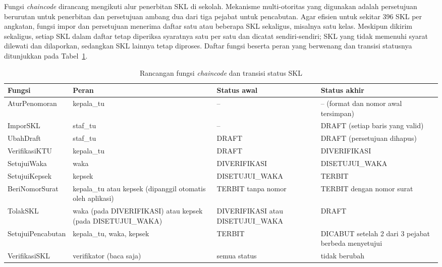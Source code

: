 Fungsi \textit{chaincode} dirancang mengikuti alur penerbitan SKL di sekolah. Mekanisme multi-otoritas yang digunakan adalah persetujuan berurutan untuk penerbitan dan persetujuan ambang dua dari tiga pejabat untuk pencabutan. Agar efisien untuk sekitar 396 SKL per angkatan, fungsi impor dan persetujuan menerima daftar satu atau beberapa SKL sekaligus, misalnya satu kelas. Meskipun dikirim sekaligus, setiap SKL dalam daftar tetap diperiksa syaratnya satu per satu dan dicatat sendiri-sendiri; SKL yang tidak memenuhi syarat dilewati dan dilaporkan, sedangkan SKL lainnya tetap diproses. Daftar fungsi beserta peran yang berwenang dan transisi statusnya ditunjukkan pada Tabel~\ref{table:3.fungsi}.

\begin{table}[H]
    \centering
    \caption{Rancangan fungsi \textit{chaincode} dan transisi status SKL}
    \label{table:3.fungsi}
    \footnotesize
    \renewcommand{\arraystretch}{1.25}
    \begin{tabular}{|>{\raggedright\arraybackslash}p{}|>{\raggedright\arraybackslash}p{}|>{\raggedright\arraybackslash}p{}|>{\raggedright\arraybackslash}p{}|}
        \hline
        \textbf{Fungsi} & \textbf{Peran} & \textbf{Status awal} & \textbf{Status akhir} \\
        \hline
        AturPenomoran & kepala\_tu & -- & -- (format dan nomor awal tersimpan) \\
        \hline
        ImporSKL & staf\_tu & -- & DRAFT (setiap baris yang valid) \\
        \hline
        UbahDraft & staf\_tu & DRAFT & DRAFT (persetujuan dihapus) \\
        \hline
        VerifikasiKTU & kepala\_tu & DRAFT & DIVERIFIKASI \\
        \hline
        SetujuiWaka & waka & DIVERIFIKASI & DISETUJUI\_\allowbreak WAKA \\
        \hline
        SetujuiKepsek & kepsek & DISETUJUI\_\allowbreak WAKA & TERBIT \\
        \hline
        BeriNomorSurat & kepala\_tu atau kepsek (dipanggil otomatis oleh aplikasi) & TERBIT tanpa nomor & TERBIT dengan nomor surat \\
        \hline
        TolakSKL & waka (pada DIVERIFIKASI) atau kepsek (pada DISETUJUI\_\allowbreak WAKA) & DIVERIFIKASI atau DISETUJUI\_\allowbreak WAKA & DRAFT \\
        \hline
        SetujuiPencabutan & kepala\_tu, waka, kepsek & TERBIT & DICABUT setelah 2 dari 3 pejabat berbeda menyetujui \\
        \hline
        VerifikasiSKL & verifikator (baca saja) & semua status & tidak berubah \\
        \hline
    \end{tabular}
\end{table}

